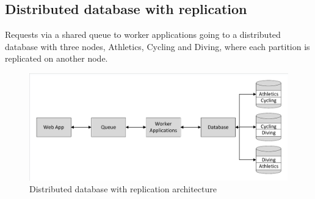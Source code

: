 %
%
\subsection{Distributed database with replication}

Requests via a shared queue to worker applications going to a distributed database with three nodes, Athletics, Cycling and Diving, where each partition is replicated on another node.

\begin{figure}
	\caption{Distributed database with replication architecture}
	\centering
	\includegraphics[trim = 5 5 5 5, clip, width=\textwidth]{img/sharedqueue_withrep}
\end{figure}